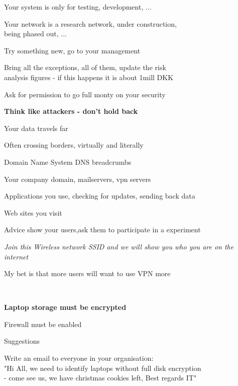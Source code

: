 \documentclass[Screen16to9,17pt,footrule]{foils}
\begin{document}


Your system is only for testing, development, ...

Your network is a research network, under construction, \\
being phased out, ...

Try something new, go to your management

Bring all the exceptions, all of them, update the risk \\
analysis figures - if this happens it is about 1mill DKK

Ask for permission to go full monty on your security

{\bf Think like attackers - don't hold back}




\begin{list2}
\item Your data travels far
\item Often crossing borders, virtually and literally
\end{list2}



Domain Name System DNS breadcrumbs
\begin{list2}
\item Your company domain, mailservers, vpn servers
\item Applications you use, checking for updates, sending back data
\item Web sites you visit
\end{list2}

Advice show your users,ask them to participate in a experiment

\emph{Join this Wireless network SSID and we will show you who you are on the internet}

My bet is that more users will want to use VPN more \smiley






{~}
\begin{list2}
\item {\bf Laptop storage must be encrypted}
\item Firewall must be enabled
\item Suggestions

\item Write an email to everyone in your organisation:\\
"Hi All, we need to identify laptops without full disk encryption \\
- come see us, we have christmas cookies left, Best regards IT"
\end{list2}
\end{document}
